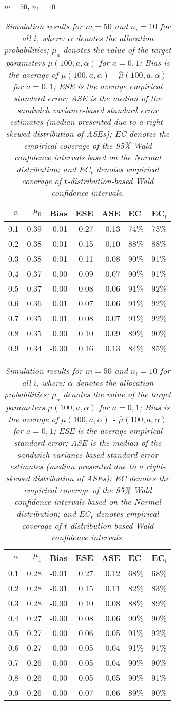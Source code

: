 \documentclass[12pt, letterpaper]{article}
\begin{document}
\begin{center}
\textbf{$m=50$, $n_i=10$} 
\end{center}
\begin{table}[ht!]
\centering
\bgroup
\def\arraystretch{1.25}
\setlength\tabcolsep{0.05in}
\begin{tabular}{rrrrrll}
  \hline
$\alpha$ & $\mu_0$ & Bias & ESE & ASE & EC & EC$_t$ \\ 
  \hline
0.1 & 0.39 & -0.01 & 0.27 & 0.13 & 74\% & 75\% \\ 
  0.2 & 0.38 & -0.01 & 0.15 & 0.10 & 88\% & 88\% \\ 
  0.3 & 0.38 & -0.01 & 0.11 & 0.08 & 90\% & 91\% \\ 
  0.4 & 0.37 & -0.00 & 0.09 & 0.07 & 90\% & 91\% \\ 
  0.5 & 0.37 & 0.00 & 0.08 & 0.06 & 91\% & 92\% \\ 
  0.6 & 0.36 & 0.01 & 0.07 & 0.06 & 91\% & 92\% \\ 
  0.7 & 0.35 & 0.01 & 0.08 & 0.07 & 91\% & 92\% \\ 
  0.8 & 0.35 & 0.00 & 0.10 & 0.09 & 89\% & 90\% \\ 
  0.9 & 0.34 & -0.00 & 0.16 & 0.13 & 84\% & 85\% \\    \hline
\end{tabular}
\egroup
\quad 
\bgroup
\setlength\tabcolsep{0.05in}
\def\arraystretch{1.25}
\begin{tabular}{rrrrrll}
  \hline
$\alpha$ & $\mu_1$ & Bias & ESE & ASE & EC & EC$_t$ \\ 
  \hline
0.1 & 0.28 & -0.01 & 0.27 & 0.12 & 68\% & 68\% \\ 
  0.2 & 0.28 & -0.01 & 0.15 & 0.11 & 82\% & 83\% \\ 
  0.3 & 0.28 & -0.00 & 0.10 & 0.08 & 88\% & 89\% \\ 
  0.4 & 0.27 & -0.00 & 0.08 & 0.06 & 90\% & 90\% \\ 
  0.5 & 0.27 & 0.00 & 0.06 & 0.05 & 91\% & 92\% \\ 
  0.6 & 0.27 & 0.00 & 0.05 & 0.04 & 91\% & 91\% \\ 
  0.7 & 0.26 & 0.00 & 0.05 & 0.04 & 90\% & 90\% \\ 
  0.8 & 0.26 & 0.00 & 0.05 & 0.05 & 90\% & 91\% \\ 
  0.9 & 0.26 & 0.00 & 0.07 & 0.06 & 89\% & 90\% \\ 
   \hline
\end{tabular}
\egroup
\caption*{\textit{Simulation results for $m = 50$ and $n_i = 10$ for all $i$, where: $\alpha$ denotes the allocation probabilities; $\mu_a$ denotes the value of the target parameters $\mu(100, a, \alpha)$ for $a=0,1$; Bias is the average of $\mu(100, a, \alpha)$ - $\hat{\mu}(100, a, \alpha)$ for $a=0, 1$; ESE is the average empirical standard error; ASE is the median of the sandwich variance-based standard error estimates (median presented due to a right-skewed distribution of ASEs); EC denotes the empirical coverage of the 95\% Wald confidence intervals based on the Normal distribution; and $EC_t$ denotes empirical coverage of $t$-distribution-based Wald confidence intervals.}}
\end{table}
\end{document}
